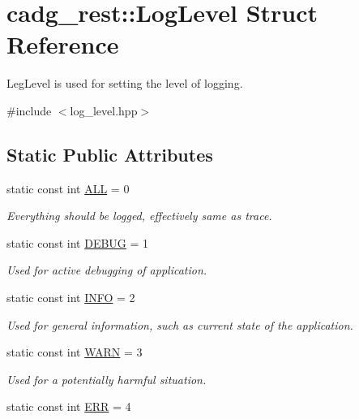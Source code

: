 \hypertarget{structcadg__rest_1_1_log_level}{}\section{cadg\+\_\+rest\+::Log\+Level Struct Reference}
\label{structcadg__rest_1_1_log_level}


Leg\+Level is used for setting the level of logging.  




{\ttfamily \#include $<$log\+\_\+level.\+hpp$>$}

\subsection*{Static Public Attributes}
\begin{DoxyCompactItemize}
\item 
static const int \mbox{\hyperlink{structcadg__rest_1_1_log_level_af386ba1f5d4bf541fa52e236a2993462}{A\+LL}} = 0
\begin{DoxyCompactList}\small\item\em Everything should be logged, effectively same as trace. \end{DoxyCompactList}\item 
static const int \mbox{\hyperlink{structcadg__rest_1_1_log_level_a9d1ad5869bfdd4fed414b2dc5003c96d}{D\+E\+B\+UG}} = 1
\begin{DoxyCompactList}\small\item\em Used for active debugging of application. \end{DoxyCompactList}\item 
static const int \mbox{\hyperlink{structcadg__rest_1_1_log_level_a126732fe6956d50f96c61ca298e835db}{I\+N\+FO}} = 2
\begin{DoxyCompactList}\small\item\em Used for general information, such as current state of the application. \end{DoxyCompactList}\item 
static const int \mbox{\hyperlink{structcadg__rest_1_1_log_level_a3a2ce9f6e0bc59cd275bd85542930e94}{W\+A\+RN}} = 3
\begin{DoxyCompactList}\small\item\em Used for a potentially harmful situation. \end{DoxyCompactList}\item 
static const int \mbox{\hyperlink{structcadg__rest_1_1_log_level_a632f12b40200c49e53fd757f33939f2b}{E\+RR}} = 4

\end{DoxyCompactItemize}
